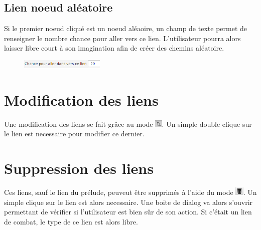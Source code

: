 		\subsection{Lien noeud aléatoire}\label{subsection:lienAléatoire}
			Si le premier noeud cliqué est un noeud aléaoire, un champ de texte permet de renseigner le nombre chance pour aller vers ce lien. L'utilisateur pourra alors laisser libre court à son imagination afin de créer des chemins aléatoire.\\

			\begin{figure}[H]
				\centering\includegraphics[width=4cm]{img/lienAleatoire.png}
			\end{figure}


	\section{Modification des liens}
		Une modification des liens se fait grâce au mode \includegraphics[height=10pt]{img/modeSelected.png}. Un simple double clique sur le lien est necessaire pour modifier ce dernier.

	\section{Suppression des liens}
		Ces liens, sauf le lien du prélude, peuveut être supprimés à l'aide du mode \includegraphics[height=0.4cm]{img/modeSupression.png}. Un simple clique sur le lien est alors necessaire. Une boite de dialog va alors s'ouvrir permettant de vérifier si l'utilisateur est bien sûr de son action.
		Si c'était un lien de combat, le type de ce lien est alors libre.
